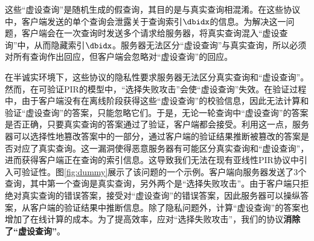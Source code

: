 这些“虚设查询”是随机生成的假查询，其目的是与真实查询相混淆。在这些协议中，客户端发送的单个查询会泄露关于查询索引$\dbidx$的信息。为解决这一问题，客户端会在一次查询时发送多个请求给服务器，将真实查询混入“虚设查询”中，从而隐藏索引$\dbidx$。服务器无法区分“虚设查询”与真实查询，所以必须对所有查询作出回应，但客户端会忽略对“虚设查询”的回应。

在半诚实环境下，这些协议的隐私性要求服务器无法区分真实查询和“虚设查询”。然而，在可验证PIR的模型中，“选择失败攻击”会使“虚设查询”失效。在验证过程中，由于客户端没有在离线阶段获得这些“虚设查询”的校验信息，因此无法计算和验证“虚设查询”的答案，只能忽略它们。于是，无论一轮查询中“虚设查询”的答案是否正确，只要真实查询的答案通过了验证，客户端都会接受。利用这一点，服务器可以选择性地篡改答案中的一部分，通过客户端的验证结果推断被篡改的答案是否对应了真实查询。这一漏洞使得恶意服务器有可能区分真实查询和“虚设查询”，进而获得客户端正在查询的索引信息。这导致我们无法在现有亚线性PIR协议中引入可验证性。图\ref{fig:dummy}展示了该问题的一个示例。客户端向服务器发送了3个查询，其中第一个查询是真实查询，另外两个是“选择失败攻击”。由于客户端只拒绝对真实查询的错误答案，接受对“虚设查询”的错误答案，因此服务器可以操纵答案，从客户端的验证结果中推断信息。除了隐私问题外，计算“虚设查询”的答案也增加了在线计算的成本。为了提高效率，应对“选择失败攻击”，我们的协议\textbf{消除了“虚设查询”}。

